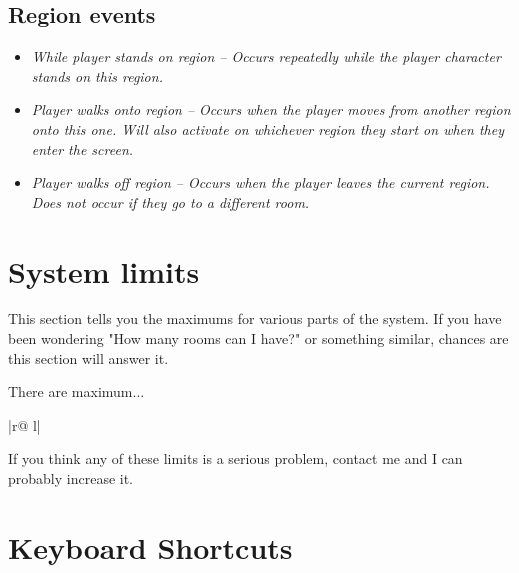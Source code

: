 \subsection{Region events}%

\begin{itemize}
\item \it{While player stands on region} -- Occurs repeatedly while the player character stands on this region.
\item \it{Player walks onto region} -- Occurs when the player moves from another region onto this one. Will
  also activate on whichever region they start on when they enter the screen.
\item \it{Player walks off region} -- Occurs when the player leaves the current region. Does not occur
  if they go to a different room.
\end{itemize}



\section{System limits}%

This section tells you the maximums for various parts of the system. If you
have been wondering "How many rooms can I have?" or something similar,
chances are this section will answer it.

There are maximum...
\begin{tabular}{|r@{ }l|}
\end{tabular}

If you think any of these limits is a serious problem, contact me and I can
probably increase it.

\section{Keyboard Shortcuts}\label{KeyboardShortcuts}%

